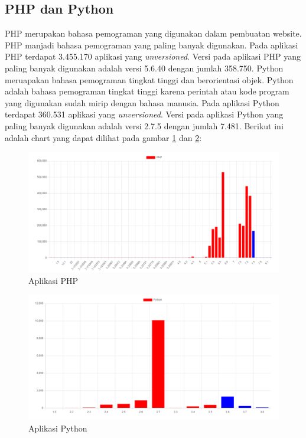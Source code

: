 \subsection{PHP dan Python}
PHP merupakan bahasa pemograman yang digunakan dalam pembuatan website. PHP manjadi bahasa pemograman yang paling banyak digunakan. Pada aplikasi PHP terdapat 3.455.170 aplikasi yang \textit{unversioned}. Versi pada aplikasi PHP yang paling banyak digunakan adalah versi 5.6.40 dengan jumlah 358.750.
Python meruapakan bahasa pemograman tingkat tinggi dan berorientasi objek. Python adalah bahasa pemograman tingkat tinggi karena perintah atau kode program yang digunakan sudah mirip dengan bahasa manusia. Pada aplikasi Python terdapat 360.531 aplikasi yang \textit{unversioned}. Versi pada aplikasi Python yang paling banyak digunakan adalah versi 2.7.5 dengan jumlah 7.481. Berikut ini adalah chart yang dapat dilihat pada gambar \ref{fig:data_sample_php} dan \ref{fig:data_sample_python}:
\begin{figure}[H]
	\centering  
	\includegraphics[scale=0.7]{Gambar/data_sample_php.png}  
	\caption{Aplikasi PHP} 
	\label{fig:data_sample_php} 
\end{figure}

\begin{figure}[H]
	\centering  
	\includegraphics[scale=0.7]{Gambar/data_sample_python.png}  
	\caption{Aplikasi Python} 
	\label{fig:data_sample_python} 
\end{figure}

